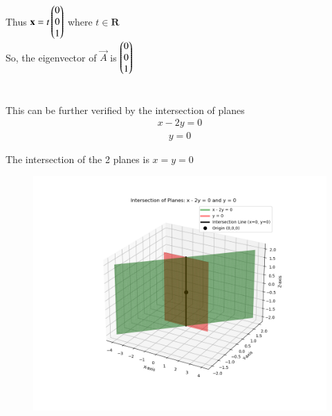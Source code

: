 \documentclass[journal]{IEEEtran}
\begin{document}
Thus $\mathbf{x} = t\begin{pmatrix}0 \\ 0 \\ 1\end{pmatrix}$ where $t \in \mathbf{R}$ \\
So, the eigenvector of $\vec{A}$ is $\begin{pmatrix}0 \\ 0 \\ 1\end{pmatrix}$ \\ \\ \\

This can be further verified by the intersection of planes
\begin{align}
x - 2y = 0
\end{align}
\begin{align}
y = 0
\end{align}


The intersection of the 2 planes is $x=y=0$
    \begin{figure}[H]
        \centering
        \includegraphics[height=0.5\textheight, keepaspectratio]{figs/Figure_1.png}
        \label{figure_1}
    \end{figure}
\end{document}
